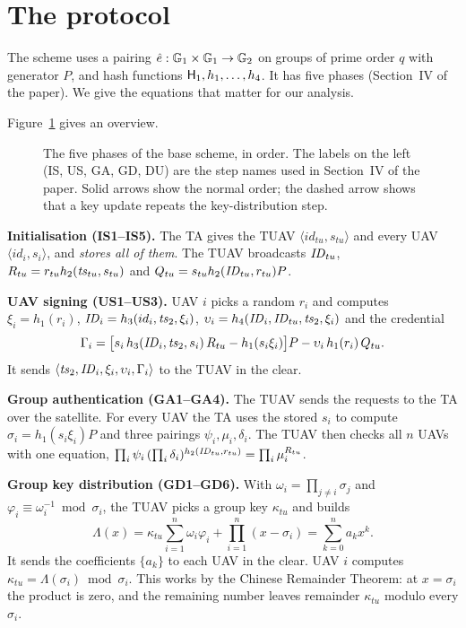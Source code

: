 \documentclass[11pt,openany]{report}
\begin{document}
\section{The protocol}
The scheme uses a pairing $\hat e:\mathbb{G}_1\times\mathbb{G}_1\to\mathbb{G}_2$ on groups of prime order $q$ with generator $P$, and hash functions $\mathsf{H}_1,h_1,\dots,h_4$. It has
five phases (Section~IV of the paper). We give the equations that matter for our analysis.

Figure~\ref{fig:phases} gives an overview.

\begin{figure}[H]
\centering
\resizebox{\linewidth}{!}{}
\caption{The five phases of the base scheme, in order. The labels on the left (IS, US, GA, GD, DU) are the step names used in Section~IV of the
paper. Solid arrows show the normal order; the dashed arrow shows that a key update repeats the key-distribution step.}
\label{fig:phases}
\end{figure}

\textbf{Initialisation (IS1--IS5).} The TA gives the TUAV $\langle id_{tu},s_{tu}\rangle$ and every UAV $\langle id_i,s_i\rangle$, and \emph{stores all of
them}. The TUAV broadcasts $\mathit{ID}_{tu}$, $R_{tu}=r_{tu}h_2(\mathit{ts}_{tu},s_{tu})$ and $Q_{tu}=s_{tu}h_2(\mathit{ID}_{tu},r_{tu})P$.

\textbf{UAV signing (US1--US3).} UAV $i$ picks a random $r_i$ and computes $\xi_i=h_1(r_i)$, $\mathit{ID}_i=h_3(id_i,\mathit{ts}_2,\xi_i)$,
$\upsilon_i=h_4(\mathit{ID}_i,\mathit{ID}_{tu},\mathit{ts}_2,\xi_i)$ and the credential
\begin{equation}\label{eq:gamma}
\Gamma_i=\big[s_i\,h_3(\mathit{ID}_i,\mathit{ts}_2,s_i)\,R_{tu}-h_1(s_i\xi_i)\big]P-\upsilon_i\,h_1(r_i)\,Q_{tu}.
\end{equation}
It sends $\langle\mathit{ts}_2,\mathit{ID}_i,\xi_i,\upsilon_i,\Gamma_i\rangle$ to the TUAV in the clear.

\textbf{Group authentication (GA1--GA4).} The TUAV sends the requests to the TA over the satellite. For every UAV the TA uses the stored $s_i$ to compute
$\sigma_i=h_1(s_i\xi_i)P$ and three pairings $\psi_i,\mu_i,\delta_i$. The TUAV then checks all $n$ UAVs with one equation,
$\prod_i\psi_i\,(\prod_i\delta_i)^{h_2(\mathit{ID}_{tu},r_{tu})}=\prod_i\mu_i^{R_{tu}}$.

\textbf{Group key distribution (GD1--GD6).} With $\omega_i=\prod_{j\ne i}\sigma_j$ and $\varphi_i\equiv\omega_i^{-1}\bmod\sigma_i$, the TUAV picks a group key
$\kappa_{tu}$ and builds
\begin{equation}\label{eq:lambda}
\Lambda(x)=\kappa_{tu}\sum_{i=1}^n\omega_i\varphi_i+\prod_{i=1}^n(x-\sigma_i)=\sum_{k=0}^{n}a_kx^k .
\end{equation}
It sends the coefficients $\{a_k\}$ to each UAV in the clear. UAV $i$ computes $\kappa_{tu}=\Lambda(\sigma_i)\bmod\sigma_i$. This works by the Chinese
Remainder Theorem: at $x=\sigma_i$ the product is zero, and the remaining number leaves remainder $\kappa_{tu}$ modulo every $\sigma_i$.
\end{document}
